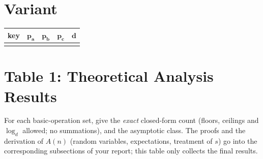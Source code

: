 \documentclass[11pt]{article}
\newcommand{\fillcell}{\rule{0pt}{2.2em}}
\begin{document}
\section*{Variant}
\begin{center}
\begin{tabular}{|C{2.2cm}|C{2.2cm}|C{2.2cm}|C{2.2cm}|C{2.2cm}|}
\hline
\textbf{key} & $\boldsymbol{p_a}$ & $\boldsymbol{p_b}$ & $\boldsymbol{p_c}$ & $\boldsymbol{d}$ \\ \hline
\fillcell & \fillcell & \fillcell & \fillcell & \fillcell \\ \hline
\end{tabular}
\end{center}

\section*{Table 1: Theoretical Analysis Results}

For each basic-operation set, give the \emph{exact} closed-form count
(floors, ceilings and $\log_d$ allowed; no summations), and the
asymptotic class. The proofs and the
derivation of $A(n)$ (random variables, expectations, treatment of
$s$) go into the corresponding subsections of your report; this table
only collects the final results.
\end{document}

